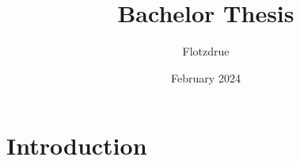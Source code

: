 \documentclass{article}
\title{Bachelor Thesis}
\author{Flotzdrue }
\date{February 2024}
\begin{document}
\maketitle

\section{Introduction}
\end{document}
